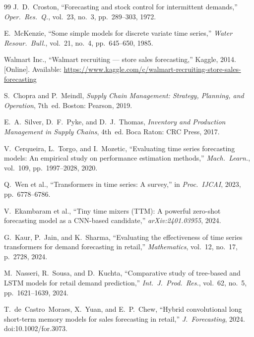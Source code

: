 \documentclass[journal]{IEEEtran}
\begin{document}
\begin{thebibliography}{99}
J.~D.~Croston,
``Forecasting and stock control for intermittent demands,''
\emph{Oper.\ Res.\ Q.}, vol.~23, no.~3, pp.~289--303, 1972.

E.~McKenzie,
``Some simple models for discrete variate time series,''
\emph{Water Resour.\ Bull.}, vol.~21, no.~4, pp.~645--650, 1985.

Walmart Inc., ``Walmart recruiting — store sales forecasting,''
Kaggle, 2014. [Online]. Available: \url{https://www.kaggle.com/c/walmart-recruiting-store-sales-forecasting}

S.~Chopra and P.~Meindl,
\emph{Supply Chain Management: Strategy, Planning, and Operation}, 7th~ed.
Boston: Pearson, 2019.

E.~A.~Silver, D.~F.~Pyke, and D.~J.~Thomas,
\emph{Inventory and Production Management in Supply Chains}, 4th~ed.
Boca Raton: CRC Press, 2017.

V.~Cerqueira, L.~Torgo, and I.~Mozetic,
``Evaluating time series forecasting models: An empirical study on performance estimation methods,''
\emph{Mach.\ Learn.}, vol.~109, pp.~1997--2028, 2020.

Q.~Wen et al.,
``Transformers in time series: A survey,''
in \emph{Proc.\ IJCAI}, 2023, pp.~6778--6786.

V.~Ekambaram et al.,
``Tiny time mixers (TTM): A powerful zero-shot forecasting model as a CNN-based candidate,''
\emph{arXiv:2401.03955}, 2024.

G.~Kaur, P.~Jain, and K.~Sharma,
``Evaluating the effectiveness of time series transformers for demand forecasting in retail,''
\emph{Mathematics}, vol.~12, no.~17, p.~2728, 2024.

M.~Nasseri, R.~Sousa, and D.~Kuchta,
``Comparative study of tree-based and LSTM models for retail demand prediction,''
\emph{Int.\ J.\ Prod.\ Res.}, vol.~62, no.~5, pp.~1621--1639, 2024.

T.~de~Castro~Moraes, X.~Yuan, and E.~P.~Chew,
``Hybrid convolutional long short-term memory models for sales forecasting in retail,''
\emph{J.\ Forecasting}, 2024. doi:10.1002/for.3073.

\end{thebibliography}
\end{document}
